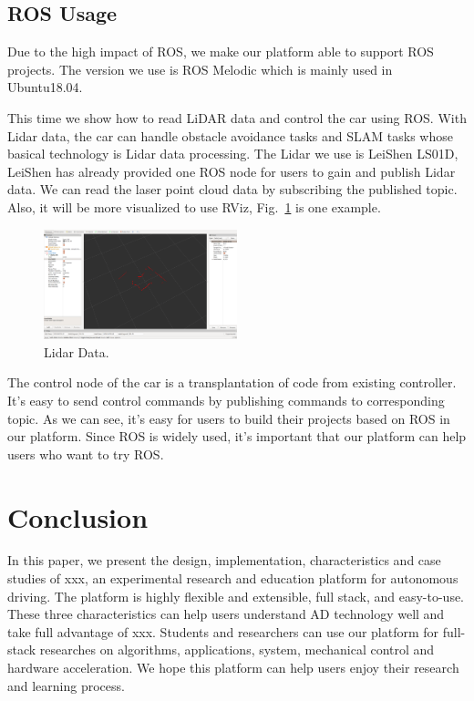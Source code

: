 \documentclass[conference]{IEEEtran}
\begin{document}
\begin{sloppypar}
\subsection{ROS Usage}
Due to the high impact of ROS, we make our platform able to support ROS projects. The version we use is ROS Melodic\cite{b35} which is mainly used in Ubuntu18.04. 

This time we show how to read LiDAR data and control the car using ROS. With Lidar data, the car can handle obstacle avoidance tasks and SLAM\cite{b36} tasks whose basical technology is Lidar data processing.
The Lidar we use is LeiShen LS01D\cite{b37}, LeiShen has already provided one ROS node for users to gain and publish Lidar data. We can read the  laser point cloud data by subscribing the published topic. Also, it will be more visualized to use RViz\cite{b38}, Fig.~\ref{ld} is one example.

\begin{figure}[htbp]
\centerline{\includegraphics[width=0.5\textwidth]{laser.png}}
\caption{Lidar Data.}
\label{ld}
\end{figure}

The control node of the car is a transplantation of code from existing controller. It's easy to send control commands by publishing commands to corresponding topic. As we can see, it's easy for users to build their projects based on ROS in our platform. Since ROS is widely used, it's important that our platform can help users who want to try ROS.

\section{Conclusion}
In this paper, we present the design, implementation, characteristics and case studies of xxx, an experimental research and education platform for autonomous driving. The platform is highly flexible and extensible, full stack, and easy-to-use. These three characteristics can help users understand AD technology well and take full advantage of xxx. Students and researchers can use our platform for full-stack researches on algorithms, applications, system, mechanical control and hardware acceleration. We hope this platform can help users enjoy their research and learning process.



\end{sloppypar}
\end{document}

